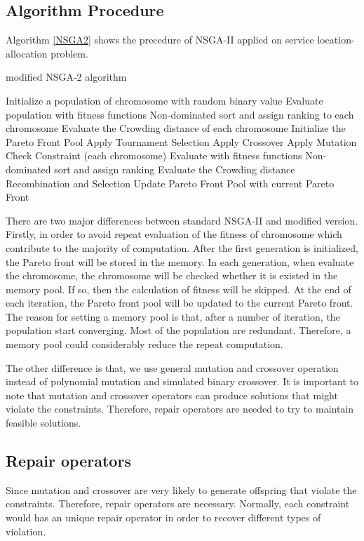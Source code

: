 \documentclass{llncs}
\begin{document}
\subsection{Algorithm Procedure}
Algorithm \ref{NSGA2} shows the precedure of NSGA-II applied on service location-allocation problem.
\begin{algorithm}
	\caption{modified NSGA-2 algorithm}
	\label{NSGA2}
	\begin{algorithmic}[1]
		\State Initialize a population of chromosome with random binary value
		\State Evaluate population with fitness functions
		\State Non-dominated sort and assign ranking to each chromosome
		\State Evaluate the Crowding distance of each chromosome
		\State Initialize the Pareto Front Pool
		\State Apply Tournament Selection
		\State Apply Crossover 
		\State Apply Mutation
		\State Check Constraint
		\For(each chromosome)
		\State Evaluate with fitness functions
		\EndIf
		\State Non-dominated sort and assign ranking
		\State Evaluate the Crowding distance
		\EndFor
		\State Recombination and Selection
		\State Update Pareto Front Pool with current Pareto Front
		\EndWhile
	\end{algorithmic}
\end{algorithm}

There are two major differences between standard NSGA-II and modified version. Firstly, in order to avoid repeat evaluation of the fitness
of chromosome which contribute to the majority of computation. After the first generation is initialized, the Pareto front will be 
stored in the memory. In each generation, when evaluate the chromosome, the chromosome will be checked whether it is existed in the memory pool. 
If so, then the calculation of fitness will be skipped. At the end of each iteration, the Pareto front pool will be updated to the current Pareto front.
The reason for setting a memory pool is that, after a number of iteration, the population start converging. 
Most of the population are redundant. Therefore, a memory pool could considerably reduce the repeat computation.

The other difference is that, we use general mutation and crossover operation instead of polynomial mutation and simulated binary crossover.
It is important to note that mutation and crossover operators can produce solutions that might violate the constraints. 
Therefore, repair operators are needed to try to maintain feasible solutions.
\subsection{Repair operators}
Since mutation and crossover are very likely to generate offspring that violate the constraints. Therefore, 
repair operators are necessary. Normally, each constraint would has an unique repair operator 
in order to recover different types of violation.
\end{document}
